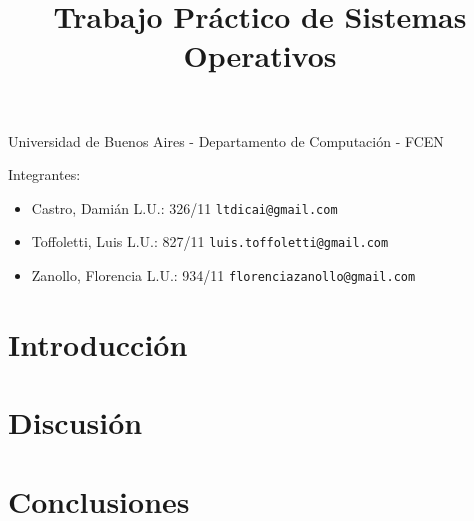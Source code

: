 \documentclass[a4paper,11pt]{article}
\title{Trabajo Práctico de Sistemas Operativos}
\begin{document}
\maketitle

\begin{center}
	Universidad de Buenos Aires - Departamento de Computaci\'on - FCEN
\end{center}

\vspace{2cm}
Integrantes:

\begin{itemize}
	\item Castro, Dami\'an L.U.: 326/11  \verb+ltdicai@gmail.com+
	\item Toffoletti, Luis L.U.: 827/11 \verb+luis.toffoletti@gmail.com+
	\item Zanollo, Florencia L.U.: 934/11 \verb+florenciazanollo@gmail.com+
\end{itemize}

\newpage

\tableofcontents

\newpage

\section{Introducción}


\section{Discusi\'on}

\section{Conclusiones}
\end{document}
